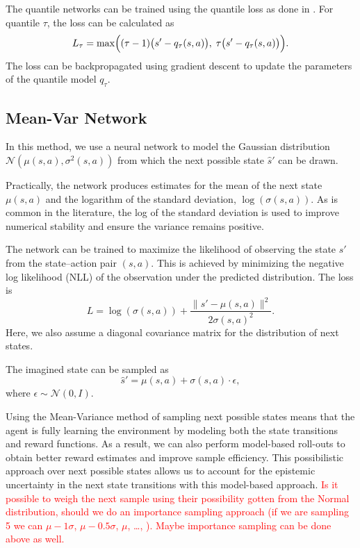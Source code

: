 \documentclass[12pt,a4paper]{report}
\newcommand\myworries[1]{\textcolor{red}{#1}}
\begin{document}
The quantile networks can be trained using the quantile loss as done in \cite{zhu2024maxmax}. For quantile \(\tau\), the loss can be calculated as 
\[
  L_\tau = \max\Bigl((\tau-1)\bigl(s' - q_\tau(s,a)\bigr),\; \tau\bigl(s' - q_\tau(s,a)\bigr)\Bigr).
\]
The loss can be backpropagated using gradient descent to update the parameters of the quantile model \(q_\tau\). 

\subsection{Mean-Var Network}

In this method, we use a neural network to model the Gaussian distribution \(\mathcal{N}(\mu(s,a), \sigma^2(s,a))\) from which the next possible state \(\hat{s}'\) can be drawn. \par Practically, the network produces estimates for the mean of the next state \(\mu(s,a)\) and the logarithm of the standard deviation, \(\log(\sigma(s,a))\). As is common in the literature, the log of the standard deviation is used to improve numerical stability and ensure the variance remains positive. \par

The network can be trained to maximize the likelihood of observing the state \(s'\) from the state--action pair \((s,a)\). This is achieved by minimizing the negative log likelihood (NLL) of the observation under the predicted distribution. The loss is 
\[
  L = \log(\sigma(s,a)) + \frac{\| s' - \mu(s,a)\|^2}{2\sigma(s,a)^2}.
\]
Here, we also assume a diagonal covariance matrix for the distribution of next states. \par

The imagined state can be sampled as 
\[
  \hat{s}' = \mu(s,a) + \sigma(s,a) \cdot \epsilon,
\]
where \(\epsilon \sim \mathcal{N}(0,I)\). \par

Using the Mean-Variance method of sampling next possible states means that the agent is fully learning the environment by modeling both the state transitions and reward functions. As a result, we can also perform model-based roll-outs to obtain better reward estimates and improve sample efficiency. This possibilistic approach over next possible states allows us to account for the epistemic uncertainty in the next state transitions with this model-based approach. \myworries{Is it possible to weigh the next sample using their possibility gotten from the Normal distribution, should we do an importance sampling approach (if we are sampling 5 we can \(\mu - 1 \sigma\), \(\mu - 0.5 \sigma\), \(\mu\), \dots,  ). Maybe importance sampling can be done above as well.}
\end{document}

